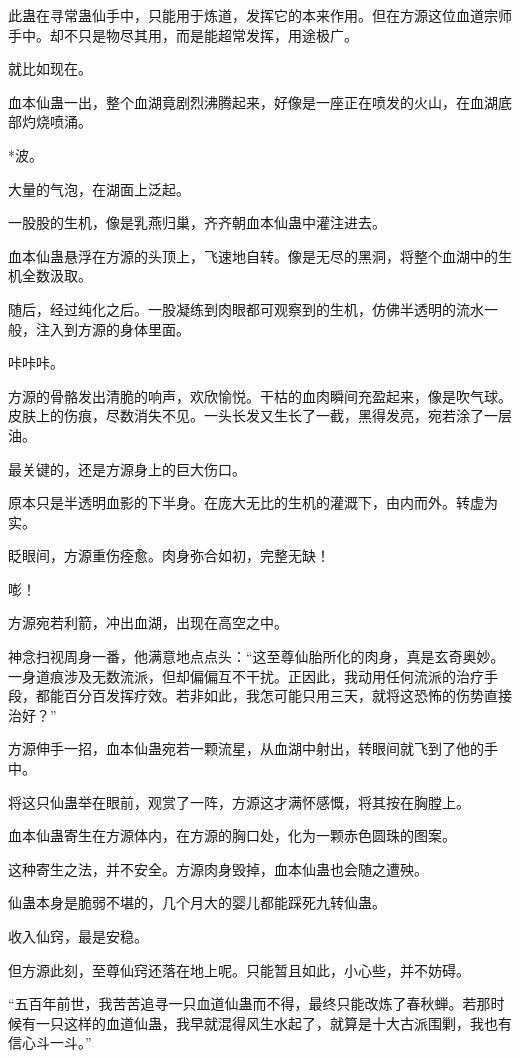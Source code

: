 \begin{this_body}
此蛊在寻常蛊仙手中，只能用于炼道，发挥它的本来作用。但在方源这位血道宗师手中。却不只是物尽其用，而是能超常发挥，用途极广。

就比如现在。

血本仙蛊一出，整个血湖竟剧烈沸腾起来，好像是一座正在喷发的火山，在血湖底部灼烧喷涌。

*波。

大量的气泡，在湖面上泛起。

一股股的生机，像是乳燕归巢，齐齐朝血本仙蛊中灌注进去。

血本仙蛊悬浮在方源的头顶上，飞速地自转。像是无尽的黑洞，将整个血湖中的生机全数汲取。

随后，经过纯化之后。一股凝练到肉眼都可观察到的生机，仿佛半透明的流水一般，注入到方源的身体里面。

咔咔咔。

方源的骨骼发出清脆的响声，欢欣愉悦。干枯的血肉瞬间充盈起来，像是吹气球。皮肤上的伤痕，尽数消失不见。一头长发又生长了一截，黑得发亮，宛若涂了一层油。

最关键的，还是方源身上的巨大伤口。

原本只是半透明血影的下半身。在庞大无比的生机的灌溉下，由内而外。转虚为实。

眨眼间，方源重伤痊愈。肉身弥合如初，完整无缺！

嘭！

方源宛若利箭，冲出血湖，出现在高空之中。

神念扫视周身一番，他满意地点点头：“这至尊仙胎所化的肉身，真是玄奇奥妙。一身道痕涉及无数流派，但却偏偏互不干扰。正因此，我动用任何流派的治疗手段，都能百分百发挥疗效。若非如此，我怎可能只用三天，就将这恐怖的伤势直接治好？”

方源伸手一招，血本仙蛊宛若一颗流星，从血湖中射出，转眼间就飞到了他的手中。

将这只仙蛊举在眼前，观赏了一阵，方源这才满怀感慨，将其按在胸膛上。

血本仙蛊寄生在方源体内，在方源的胸口处，化为一颗赤色圆珠的图案。

这种寄生之法，并不安全。方源肉身毁掉，血本仙蛊也会随之遭殃。

仙蛊本身是脆弱不堪的，几个月大的婴儿都能踩死九转仙蛊。

收入仙窍，最是安稳。

但方源此刻，至尊仙窍还落在地上呢。只能暂且如此，小心些，并不妨碍。

“五百年前世，我苦苦追寻一只血道仙蛊而不得，最终只能改炼了春秋蝉。若那时候有一只这样的血道仙蛊，我早就混得风生水起了，就算是十大古派围剿，我也有信心斗一斗。”


\end{this_body}
